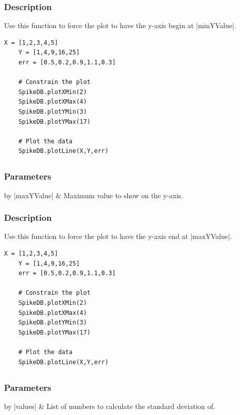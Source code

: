 \documentclass{report}
\begin{document}
\subsubsection{Description}
Use this function to force the plot to have the y-axis begin at |minYValue|.
\begin{lstlisting}[caption=Example]
	X = [1,2,3,4,5]
	Y = [1,4,9,16,25]
	err = [0.5,0.2,0.9,1.1,0.3]

	# Constrain the plot
	SpikeDB.plotXMin(2)
	SpikeDB.plotXMax(4)
	SpikeDB.plotYMin(3)
	SpikeDB.plotYMax(17)

	# Plot the data
	SpikeDB.plotLine(X,Y,err)
\end{lstlisting}


\clearpage
\subsection{}
\subsubsection{Parameters}
\begin{table}[h]
\begin{center}
\begin{tabular}{by}
		|maxYValue| & Maximum value to show on the y-axis.\\
	\end{tabular}
\end{center}
\end{table}
\subsubsection{Description}
Use this function to force the plot to have the y-axis end at |maxYValue|.
\begin{lstlisting}[caption=Example]
	X = [1,2,3,4,5]
	Y = [1,4,9,16,25]
	err = [0.5,0.2,0.9,1.1,0.3]

	# Constrain the plot
	SpikeDB.plotXMin(2)
	SpikeDB.plotXMax(4)
	SpikeDB.plotYMin(3)
	SpikeDB.plotYMax(17)

	# Plot the data
	SpikeDB.plotLine(X,Y,err)
\end{lstlisting}


\clearpage
\subsection{}
\subsubsection{Parameters}
\begin{table}[h]
\begin{center}
\begin{tabular}{by}
		|values| & List of numbers to calculate the standard deviation of.\\
	\end{tabular}
\end{center}
\end{table}
\end{document}

